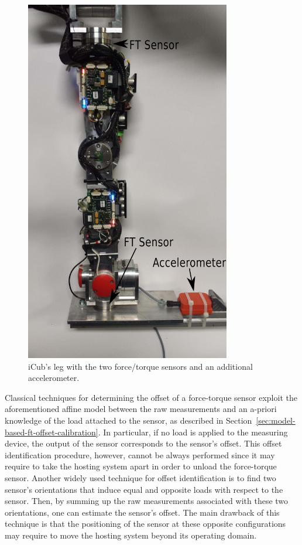 \begin{figure}
\vspace{0em}
\centering
\includegraphics[width=0.8\textwidth]{images/leg.pdf}
\caption{iCub's leg with the two force/torque sensors and an additional accelerometer.}
\label{fig:iCubLeg}
\end{figure} 

Classical techniques for determining the offset of a force-torque sensor exploit the aforementioned affine model between 
the raw measurements and an a-priori knowledge of the load attached to the sensor, as described in Section~\ref{sec:model-based-ft-offset-calibration}. In particular, if no load is applied to the measuring device, the output of the sensor corresponds to 
the sensor's offset. This offset identification procedure, however, cannot be always performed since it may require to take the hosting system apart
in order to unload the force-torque sensor. Another widely used technique for offset identification is to find two sensor's orientations that induce
equal and opposite loads with respect to the sensor. Then, by summing up the raw measurements associated with these two orientations, one can estimate
the sensor's offset. The main drawback of this technique is that the positioning of the sensor at these opposite configurations may require to move
the hosting system beyond its operating domain.

